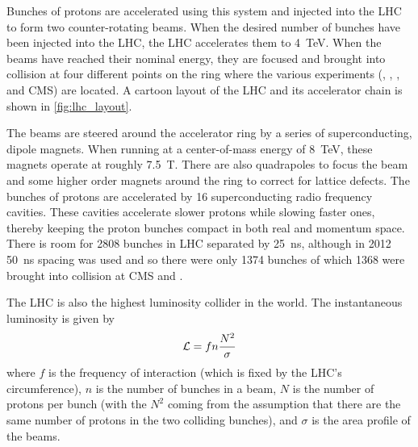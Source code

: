 Bunches of protons are accelerated using this system and injected into the LHC
to form two counter-rotating beams. When the desired number of bunches have
been injected into the LHC, the LHC accelerates them to \SI{4}{\TeV}. When the
beams have reached their nominal energy, they are focused and brought into
collision at four different points on the ring where the various experiments
(\ALICE, \ATLAS, \LHCB, and CMS) are located. A cartoon layout of the LHC and
its accelerator chain is shown in \cref{fig:lhc_layout}.

The beams are steered around the accelerator ring by a series of
superconducting, dipole magnets. When running at a center-of-mass energy of
\SI{8}{\TeV}, these magnets operate at roughly \SI{7.5}{\tesla}. There are also
quadrapoles to focus the beam and some higher order magnets around the ring to
correct for lattice defects. The bunches of protons are accelerated by \num{16}
superconducting radio frequency cavities. These cavities accelerate slower
protons while slowing faster ones, thereby keeping the proton bunches compact
in both real and momentum space. There is room for 2808 bunches in LHC
separated by \SI{25}{\nano\second}, although in 2012 \SI{50}{\nano\second}
spacing was used and so there were only \num{1374} bunches of which \num{1368}
were brought into collision at CMS and \ATLAS.

The LHC is also the highest luminosity collider in the world. The instantaneous
luminosity is given by
\begin{equation}
    \mathcal{L} = f n \frac{N^{2}}{\sigma}
\end{equation}
where $f$ is the frequency of interaction (which is fixed by the LHC's
circumference), $n$ is the number of bunches in a beam, $N$ is the number of
protons per bunch (with the $N^{2}$ coming from the assumption that there are
the same number of protons in the two colliding bunches), and $\sigma$ is the
area profile of the beams.

